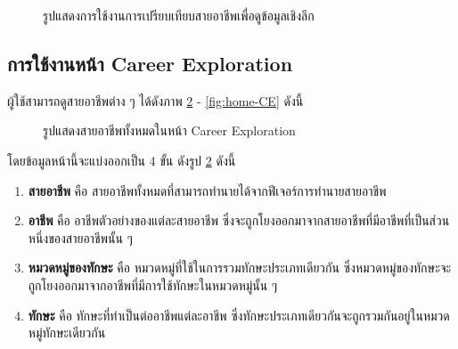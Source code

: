 \begin{figure}[H]\centering
    \caption{รูปแสดงการใช้งานการเปรียบเทียบสายอาชีพเพื่อดูข้อมูลเชิงลึก}\label{fig:compare-CI}
\end{figure}
\subsection{การใช้งานหน้า Career Exploration}
ผู้ใช้สามารถดูสายอาชีพต่าง ๆ ได้ดังภาพ \ref{fig:info-CE} - \ref{fig:home-CE} ดังนี้
\begin{figure}[H]\centering
    \caption{รูปแสดงสายอาชีพทั้งหมดในหน้า Career Exploration}\label{fig:info-CE}
\end{figure}
โดยข้อมูลหน้านี้จะแบ่งออกเป็น 4 ขั้น ดังรูป \ref{fig:info-CE} ดังนี้
\begin{enumerate}
    \item \textbf{สายอาชีพ} คือ สายอาชีพทั้งหมดที่สามารถทำนายได้จากฟีเจอร์การทำนายสายอาชีพ
    \item \textbf{อาชีพ} คือ อาชีพตัวอย่างของแต่ละสายอาชีพ ซึ่งจะถูกโยงออกมาจากสายอาชีพที่มีอาชีพที่เป็นส่วนหนึ่งของสายอาชีพนั้น ๆ
    \item \textbf{หมวดหมู่ของทักษะ} คือ หมวดหมู่ที่ใช้ในการรวมทักษะประเภทเดียวกัน ซึ่งหมวดหมู่ของทักษะจะถูกโยงออกมาจากอาชีพที่มีการใช้ทักษะในหมวดหมู่นั้น ๆ 
    \item \textbf{ทักษะ} คือ ทักษะที่ทำเป็นต่ออาชีพแต่ละอาชีพ ซึ่งทักษะประเภทเดียวกันจะถูกรวมกันอยู่ในหมวดหมู่ทักษะเดียวกัน
\end{enumerate}

